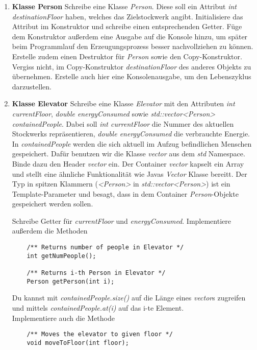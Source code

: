 \begin{enumerate}
\item \textbf{Klasse Person}
Schreibe eine Klasse \emph{Person}.
Diese soll ein Attribut \emph{int destinationFloor} haben, welches das Zielstockwerk angibt. 
Initialisiere das Attribut im Konstruktor und schreibe einen entsprechenden Getter.
Füge dem Konstruktor außerdem eine Ausgabe auf die Konsole hinzu, um später beim Programmlauf den Erzeugungsprozess besser nachvollziehen zu können.
Erstelle zudem einen Destruktor für \emph{Person} sowie den Copy-Konstruktor.
Vergiss nicht, im Copy-Konstruktor \emph{destinationFloor} des anderes Objekts zu übernehmen.
Erstelle auch hier eine Konsolenausgabe, um den Lebenszyklus darzustellen.

\item \textbf{Klasse Elevator}
Schreibe eine Klasse \emph{Elevator} mit den Attributen \emph{int currentFloor}, \emph{double energyConsumed} sowie \emph{std::vector<Person> containedPeople}.
Dabei soll \emph{int currentFloor} die Nummer des aktuellen Stockwerks repräsentieren, \emph{double energyConsumed} die verbrauchte Energie. 
In \emph{containedPeople} werden die sich aktuell im Aufzug befindlichen Menschen gespeichert.
Dafür benutzen wir die Klasse \emph{vector} aus dem \emph{std} Namespace.
Binde dazu den Header \emph{vector} ein.
Der Container \emph{vector} kapselt ein Array und stellt eine ähnliche Funktionalität wie Javas \emph{Vector} Klasse bereitt.
Der Typ in spitzen Klammern (\emph{<Person>} in \emph{std::vector<Person>}) ist ein Template-Parameter und besagt, dass in dem Container \emph{Person}-Objekte gespeichert werden sollen.

Schreibe Getter für \emph{currentFloor} und \emph{energyConsumed}.
Implementiere außerdem die Methoden
\begin{lstlisting}
	/** Returns number of people in Elevator */
	int getNumPeople();
	
	/** Returns i-th Person in Elevator */
	Person getPerson(int i);
\end{lstlisting} 

Du kannst mit \emph{containedPeople.size()} auf die Länge eines \emph{vector}s zugreifen und mittels \emph{containedPeople.at(i)} auf das i-te Element. \\

Implementiere auch die Methode
\begin{lstlisting}
	/** Moves the elevator to given floor */
	void moveToFloor(int floor);
\end{lstlisting}


\end{enumerate}
